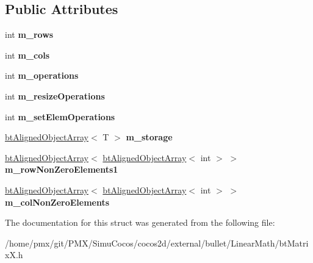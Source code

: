\subsection*{Public Attributes}
\begin{DoxyCompactItemize}
\item 
\mbox{\label{structbtMatrixX_af26e15412e9b148580d5bb69be3cb0ae}} 
int {\bfseries m\+\_\+rows}
\item 
\mbox{\label{structbtMatrixX_a2d8a0f250132b3bca108146a45c69e8a}} 
int {\bfseries m\+\_\+cols}
\item 
\mbox{\label{structbtMatrixX_ae3dc972f13cbd0917f0dd8693c17c062}} 
int {\bfseries m\+\_\+operations}
\item 
\mbox{\label{structbtMatrixX_aaad2b4383ec7c102109376c4b826a09c}} 
int {\bfseries m\+\_\+resize\+Operations}
\item 
\mbox{\label{structbtMatrixX_aa5083cc556cce608dfa81e327ebc7346}} 
int {\bfseries m\+\_\+set\+Elem\+Operations}
\item 
\mbox{\label{structbtMatrixX_a4eb45de98d1201b4b357a844e328c956}} 
\hyperlink{classbtAlignedObjectArray}{bt\+Aligned\+Object\+Array}$<$ T $>$ {\bfseries m\+\_\+storage}
\item 
\mbox{\label{structbtMatrixX_a91766c09b3f2d7efc76684b61a783c19}} 
\hyperlink{classbtAlignedObjectArray}{bt\+Aligned\+Object\+Array}$<$ \hyperlink{classbtAlignedObjectArray}{bt\+Aligned\+Object\+Array}$<$ int $>$ $>$ {\bfseries m\+\_\+row\+Non\+Zero\+Elements1}
\item 
\mbox{\label{structbtMatrixX_ab5d37c175ac2d5aa348be7bfcfd6ad5f}} 
\hyperlink{classbtAlignedObjectArray}{bt\+Aligned\+Object\+Array}$<$ \hyperlink{classbtAlignedObjectArray}{bt\+Aligned\+Object\+Array}$<$ int $>$ $>$ {\bfseries m\+\_\+col\+Non\+Zero\+Elements}
\end{DoxyCompactItemize}


The documentation for this struct was generated from the following file\+:\begin{DoxyCompactItemize}
\item 
/home/pmx/git/\+P\+M\+X/\+Simu\+Cocos/cocos2d/external/bullet/\+Linear\+Math/bt\+Matrix\+X.\+h\end{DoxyCompactItemize}
